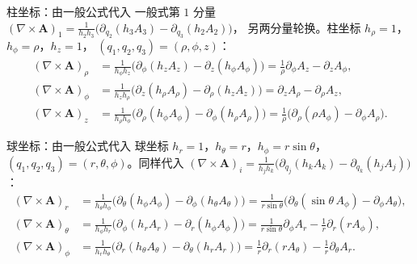 \documentclass[fontset=windows, chinese, 10pt, xcolor=dvipsnames]{beamer}
\begin{document}
\begin{frame}{柱坐标：由一般公式代入}
  一般式第 $1$ 分量
  $(\nabla\times\mathbf{A})_1
  =\frac{1}{h_2 h_3}\bigl(\partial_{q_2}(h_3 A_3)-\partial_{q_3}(h_2 A_2)\bigr)$，
  另两分量轮换。柱坐标 $h_{\rho}=1$，$h_{\phi}=\rho$，$h_z=1$，
  $(q_1,q_2,q_3)=(\rho,\phi,z)$：
  \begin{align*}
    (\nabla\times\mathbf{A})_{\rho}
    &=\frac{1}{h_{\phi}h_z}
      \bigl(\partial_{\phi}(h_z A_z)-\partial_z(h_{\phi} A_{\phi})\bigr)
    =\frac{1}{\rho}\partial_{\phi}A_z-\partial_z A_{\phi},\\
    (\nabla\times\mathbf{A})_{\phi}
    &=\frac{1}{h_z h_{\rho}}
      \bigl(\partial_z(h_{\rho} A_{\rho})-\partial_{\rho}(h_z A_z)\bigr)
    =\partial_z A_{\rho}-\partial_{\rho}A_z,\\
    (\nabla\times\mathbf{A})_z
    &=\frac{1}{h_{\rho}h_{\phi}}
      \bigl(\partial_{\rho}(h_{\phi} A_{\phi})-\partial_{\phi}(h_{\rho} A_{\rho})\bigr)
    =\frac{1}{\rho}\bigl(\partial_{\rho}(\rho A_{\phi})-\partial_{\phi}A_{\rho}\bigr).
  \end{align*}
\end{frame}

\begin{frame}{球坐标：由一般公式代入}
  球坐标 $h_r=1$，$h_{\theta}=r$，$h_{\phi}=r\sin\theta$，
  $(q_1,q_2,q_3)=(r,\theta,\phi)$。同样代入
  $(\nabla\times\mathbf{A})_i
  =\frac{1}{h_j h_k}\bigl(\partial_{q_j}(h_k A_k)-\partial_{q_k}(h_j A_j)\bigr)$：
  {\footnotesize
  \begin{align*}
    (\nabla\times\mathbf{A})_r
    &=\frac{1}{h_{\theta}h_{\phi}}
      \bigl(\partial_{\theta}(h_{\phi} A_{\phi})-\partial_{\phi}(h_{\theta} A_{\theta})\bigr)
    =\frac{1}{r\sin\theta}
      \bigl(\partial_{\theta}(\sin\theta\, A_{\phi})-\partial_{\phi}A_{\theta}\bigr),\\
    (\nabla\times\mathbf{A})_{\theta}
    &=\frac{1}{h_{\phi}h_r}
      \bigl(\partial_{\phi}(h_r A_r)-\partial_r(h_{\phi} A_{\phi})\bigr)
    =\frac{1}{r\sin\theta}\partial_{\phi}A_r
      -\frac{1}{r}\partial_r(r A_{\phi}),\\
    (\nabla\times\mathbf{A})_{\phi}
    &=\frac{1}{h_r h_{\theta}}
      \bigl(\partial_r(h_{\theta} A_{\theta})-\partial_{\theta}(h_r A_r)\bigr)
    =\frac{1}{r}\partial_r(r A_{\theta})
      -\frac{1}{r}\partial_{\theta}A_r.
  \end{align*}}
\end{frame}
\end{document}
